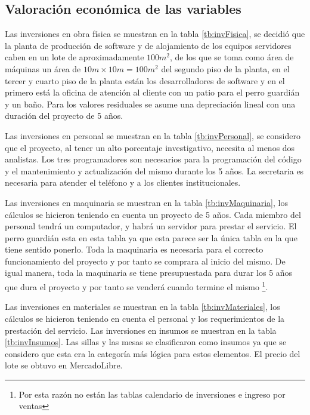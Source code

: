 \documentclass[a4paper, 12pt, oneside]{article}
\begin{document}
	\subsection{Valoración económica de las variables}
	Las inversiones en obra física se muestran en la tabla \ref{tb:invFisica}, se decidió que la planta de producción de software y de alojamiento de los equipos servidores caben en un lote de aproximadamente $100m^2$, de los que se toma como área de máquinas un área de $10m \times 10m = 100m^2$ del segundo piso de la planta, en el tercer y cuarto piso de la planta están los desarrolladores de software y en el primero está la oficina de atención al cliente con un patio para el perro guardián y un baño. Para los valores residuales se asume una depreciación lineal con una duración del proyecto de 5 años.

	Las inversiones en personal se muestran en la tabla \ref{tb:invPersonal}, se considero que el proyecto, al tener un alto porcentaje investigativo, necesita al menos dos analistas. Los tres programadores son necesarios para la programación del código y el mantenimiento y actualización del mismo durante los 5 años. La secretaria es necesaria para atender el teléfono y a los clientes institucionales.

	Las inversiones en maquinaria se muestran en la tabla \ref{tb:invMaquinaria}, los cálculos se hicieron teniendo en cuenta un proyecto de 5 años. Cada miembro del personal tendrá un computador, y habrá un servidor para prestar el servicio. El perro guardián esta en esta tabla ya que esta parece ser la única tabla en la que tiene sentido ponerlo. Toda la maquinaria es necesaria para el correcto funcionamiento del proyecto y por tanto se comprara al inicio del mismo. De igual manera, toda la maquinaria se tiene presupuestada para durar los 5 años que dura el proyecto y por tanto se venderá cuando termine el mismo \footnote{Por esta razón no están las tablas calendario de inversiones e ingreso por ventas}.
	
	Las inversiones en materiales se muestran en la tabla \ref{tb:invMateriales}, los cálculos se hicieron teniendo en cuenta el personal y los requerimientos de la prestación del servicio. Las inversiones en insumos se muestran en la tabla \ref{tb:invInsumos}. Las sillas y las mesas se clasificaron como insumos ya que se considero que esta era la categoría más lógica para estos elementos. El precio del lote se obtuvo en MercadoLibre.
	
\end{document}
